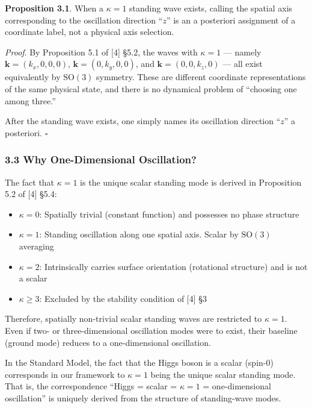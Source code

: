 \documentclass[
  a4paper,11pt]{article}
\providecommand{\tightlist}{%
  \setlength{\itemsep}{0pt}\setlength{\parskip}{0pt}}
\begin{document}
\textbf{Proposition 3.1}. When a \(\kappa = 1\) standing wave exists,
calling the spatial axis corresponding to the oscillation direction
``\(z\)'' is an a posteriori assignment of a coordinate label, not a
physical axis selection.

\emph{Proof}. By Proposition 5.1 of {[}4{]} §5.2, the waves with
\(\kappa = 1\) --- namely \(\mathbf{k} = (k_x, 0, 0, 0)\),
\(\mathbf{k} = (0, k_y, 0, 0)\), and \(\mathbf{k} = (0, 0, k_z, 0)\) ---
all exist equivalently by \(\mathrm{SO}(3)\) symmetry. These are
different coordinate representations of the same physical state, and
there is no dynamical problem of ``choosing one among three.''

After the standing wave exists, one simply names its oscillation
direction ``\(z\)'' a posteriori. \(\square\)

\subsubsection{3.3 Why One-Dimensional
Oscillation?}\label{why-one-dimensional-oscillation}

The fact that \(\kappa = 1\) is the unique scalar standing mode is
derived in Proposition 5.2 of {[}4{]} §5.4:

\begin{itemize}
\tightlist
\item
  \(\kappa = 0\): Spatially trivial (constant function) and possesses no
  phase structure
\item
  \(\kappa = 1\): Standing oscillation along one spatial axis. Scalar by
  \(\mathrm{SO}(3)\) averaging
\item
  \(\kappa = 2\): Intrinsically carries surface orientation (rotational
  structure) and is not a scalar
\item
  \(\kappa \geq 3\): Excluded by the stability condition of {[}4{]} §3
\end{itemize}

Therefore, spatially non-trivial scalar standing waves are restricted to
\(\kappa = 1\). Even if two- or three-dimensional oscillation modes were
to exist, their baseline (ground mode) reduces to a one-dimensional
oscillation.

In the Standard Model, the fact that the Higgs boson is a scalar
(spin-0) corresponds in our framework to \(\kappa = 1\) being the unique
scalar standing mode. That is, the correspondence ``Higgs = scalar =
\(\kappa = 1\) = one-dimensional oscillation'' is uniquely derived from
the structure of standing-wave modes.
\end{document}
